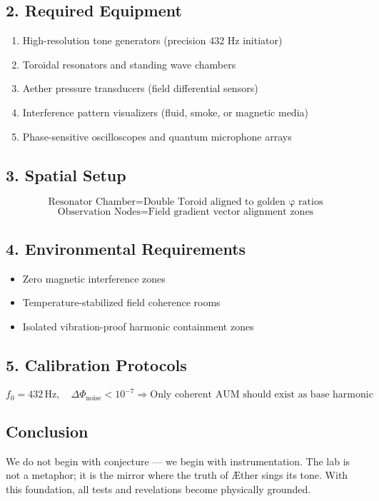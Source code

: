 \documentclass[12pt]{book}
\begin{document}
\subsection*{2. Required Equipment}
\begin{enumerate}
  \item High-resolution tone generators (precision 432 Hz initiator)
  \item Toroidal resonators and standing wave chambers
  \item Aether pressure transducers (field differential sensors)
  \item Interference pattern visualizers (fluid, smoke, or magnetic media)
  \item Phase-sensitive oscilloscopes and quantum microphone arrays
\end{enumerate}

\subsection*{3. Spatial Setup}
\[
\text{Resonator Chamber} = \text{Double Toroid aligned to golden φ ratios}
\]
\[
\text{Observation Nodes} = \text{Field gradient vector alignment zones}
\]

\subsection*{4. Environmental Requirements}
\begin{itemize}
  \item Zero magnetic interference zones
  \item Temperature-stabilized field coherence rooms
  \item Isolated vibration-proof harmonic containment zones
\end{itemize}

\subsection*{5. Calibration Protocols}
\[
f_0 = 432\,\text{Hz}, \quad \Delta \Phi_{\text{noise}} < 10^{-7}
\Rightarrow \text{Only coherent AUM should exist as base harmonic}
\]

\subsection*{Conclusion}
We do not begin with conjecture — we begin with instrumentation. The lab is not a metaphor; it is the mirror where the truth of Æther sings its tone. With this foundation, all tests and revelations become physically grounded.
\end{document}
